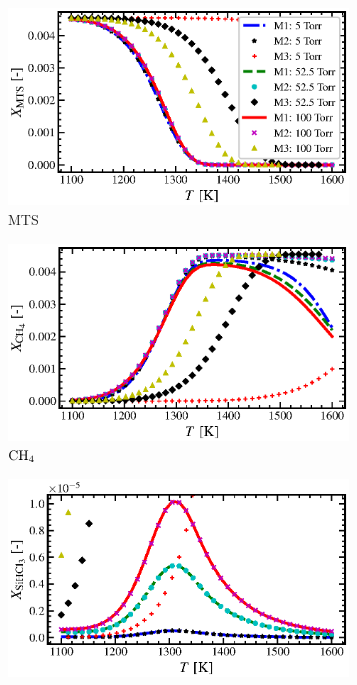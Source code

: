 \documentclass[final, letterpaper, square, comma, numbers, sort&compress]{elsarticle}
\begin{document}
\begin{figure}
    \centering
    \begin{subfigure}{0.49\textwidth}
        \centering
        \includegraphics[width=0.99\textwidth]{T-vs-MTS-compare}
        \caption{MTS}
    \end{subfigure}
    \begin{subfigure}{0.49\textwidth}
        \centering
        \includegraphics[width=0.99\textwidth]{T-vs-CH4-compare}
        \caption{$\rm CH_4$}
    \end{subfigure}
    \begin{subfigure}{0.49\textwidth}
        \centering
        \includegraphics[width=0.99\textwidth]{T-vs-SiHCl3-compare}

\end{subfigure}
\end{figure}
\end{document}
